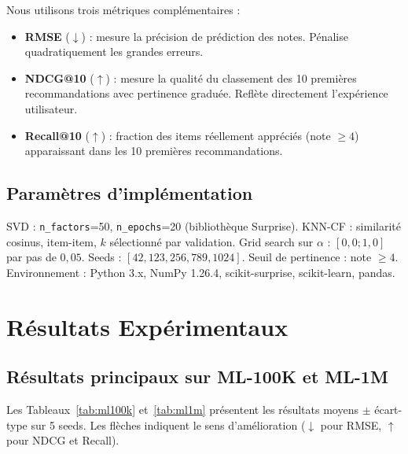 \documentclass[conference]{IEEEtran}
\begin{document}
Nous utilisons trois métriques complémentaires :
\begin{itemize}
    \item \textbf{RMSE} ($\downarrow$) : mesure la précision de prédiction des
          notes. Pénalise quadratiquement les grandes erreurs.
    \item \textbf{NDCG@10} ($\uparrow$) : mesure la qualité du classement des
          10 premières recommandations avec pertinence graduée. Reflète
          directement l'expérience utilisateur.
    \item \textbf{Recall@10} ($\uparrow$) : fraction des items réellement
          appréciés (note $\geq 4$) apparaissant dans les 10 premières
          recommandations.
\end{itemize}

\subsection{Paramètres d'implémentation}

SVD : \texttt{n\_factors}=50, \texttt{n\_epochs}=20 (bibliothèque Surprise).
KNN-CF : similarité cosinus, item-item, $k$ sélectionné par validation.
Grid search sur $\alpha$ : $[0{,}0 ; 1{,}0]$ par pas de $0{,}05$.
Seeds : $[42, 123, 256, 789, 1024]$. Seuil de pertinence : note $\geq 4$.
Environnement : Python 3.x, NumPy 1.26.4, scikit-surprise, scikit-learn,
pandas.



\section{Résultats Expérimentaux}
\label{sec:experiments}

\subsection{Résultats principaux sur ML-100K et ML-1M}

Les Tableaux~\ref{tab:ml100k} et~\ref{tab:ml1m} présentent les résultats
moyens $\pm$ écart-type sur 5 seeds. Les flèches indiquent le sens
d'amélioration ($\downarrow$ pour RMSE, $\uparrow$ pour NDCG et Recall).
\end{document}

